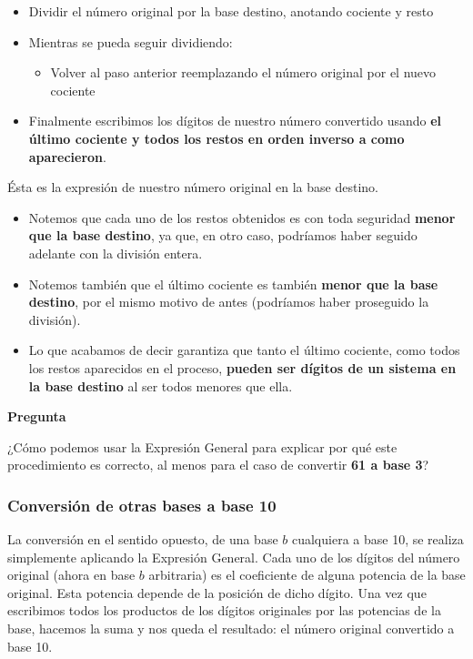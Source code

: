\documentclass[spanish,a4paper,]{article}
\providecommand{\tightlist}{%
  \setlength{\itemsep}{0pt}\setlength{\parskip}{0pt}}
\begin{document}
\begin{itemize}
\tightlist
\item
  Dividir el número original por la base destino, anotando cociente y
  resto
\item
  Mientras se pueda seguir dividiendo:

  \begin{itemize}
  \tightlist
  \item
    Volver al paso anterior reemplazando el número original por el nuevo
    cociente
  \end{itemize}
\item
  Finalmente escribimos los dígitos de nuestro número convertido usando
  \textbf{el último cociente y todos los restos en orden inverso a como
  aparecieron}.
\end{itemize}

Ésta es la expresión de nuestro número original en la base destino.

\begin{itemize}
\tightlist
\item
  Notemos que cada uno de los restos obtenidos es con toda seguridad
  \textbf{menor que la base destino}, ya que, en otro caso, podríamos
  haber seguido adelante con la división entera.
\item
  Notemos también que el último cociente es también \textbf{menor que la
  base destino}, por el mismo motivo de antes (podríamos haber
  proseguido la división).
\item
  Lo que acabamos de decir garantiza que tanto el último cociente, como
  todos los restos aparecidos en el proceso, \textbf{pueden ser dígitos
  de un sistema en la base destino} al ser todos menores que ella.
\end{itemize}

\textbf{Pregunta}

¿Cómo podemos usar la Expresión General para explicar por qué este
procedimiento es correcto, al menos para el caso de convertir \textbf{61
a base 3}?

\hypertarget{conversiuxf3n-de-otras-bases-a-base-10}{%
\subsubsection{Conversión de otras bases a base
10}\label{conversiuxf3n-de-otras-bases-a-base-10}}

La conversión en el sentido opuesto, de una base \(b\) cualquiera a base
10, se realiza simplemente aplicando la Expresión General. Cada uno de
los dígitos del número original (ahora en base \(b\) arbitraria) es el
coeficiente de alguna potencia de la base original. Esta potencia
depende de la posición de dicho dígito. Una vez que escribimos todos los
productos de los dígitos originales por las potencias de la base,
hacemos la suma y nos queda el resultado: el número original convertido
a base 10.
\end{document}
